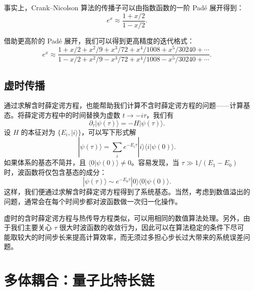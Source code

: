 事实上，Crank--Nicolson 算法的传播子可以由指数函数的一阶 Padé 展开得到：
\begin{equation}
 e^x\approx\frac{1+x/2}{1-x/2}.
\tag{6.2.35}
\end{equation}

借助更高阶的 Padé 展开，我们可以得到更高精度的迭代格式：
\begin{equation}
 e^x\approx\frac{1+x/2+x^2/9+x^3/72+x^4/1008+x^5/30240+\cdots}
 {1-x/2+x^2/9-x^3/72+x^4/1008-x^5/30240+\cdots}.
\tag{6.2.36}
\end{equation}

\subsection{虚时传播}

通过求解含时薛定谔方程，也能帮助我们计算不含时薛定谔方程的问题——计算基态。将薛定谔方程中的时间替换为虚数 $t\to-i\tau$，我们有
\begin{equation}
 \partial_\tau|\psi(\tau)\rangle=-H|\psi(\tau)\rangle.
\tag{6.2.37}
\end{equation}
设 $H$ 的本征对为 $\{E_i,|i\rangle\}$，可以写下形式解
\begin{equation}
 |\psi(\tau)\rangle=\sum_i e^{-E_i\tau}|i\rangle\langle i|\psi(0)\rangle.
\tag{6.2.38}
\end{equation}
如果体系的基态不简并，且 $\langle0|\psi(0)\rangle\ne0$。容易发现，当 $\tau\gg1/(E_1-E_0)$ 时，波函数将仅包含基态的成分：
\begin{equation}
 |\psi(\tau)\rangle\sim e^{-E_0\tau}|0\rangle\langle0|\psi(0)\rangle.
\tag{6.2.39}
\end{equation}
这样，我们便通过求解含时薛定谔方程得到了系统基态。当然，考虑到数值溢出的问题，通常会在每个时间步都对波函数做一次归一化操作。

虚时的含时薛定谔方程与热传导方程类似，可以用相同的数值算法处理。另外，由于我们主要关心 $\tau$ 很大时波函数的收敛行为，因此可以在算法稳定的条件下尽可能取较大的时间步长来提高计算效率，而无须过多担心步长过大带来的系统误差问题。


\section{多体耦合：量子比特长链}

